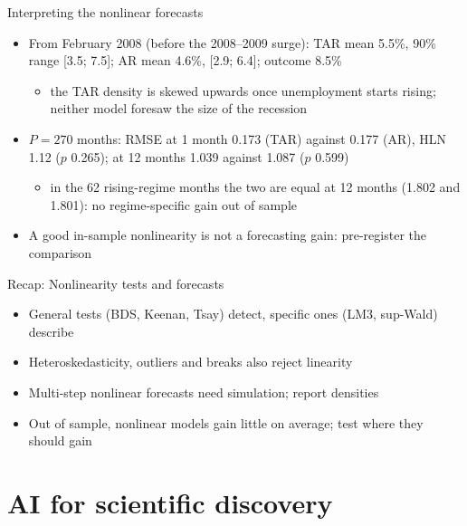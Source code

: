 \begin{frame}{Interpreting the nonlinear forecasts}
\itemsize{\small}
\begin{itemize}
    \item From February 2008 (before the 2008--2009 surge): TAR mean 5.5\%, 90\% range [3.5; 7.5]; AR mean 4.6\%, [2.9; 6.4]; outcome 8.5\%
    \begin{itemize}
        \item the TAR density is skewed upwards once unemployment starts rising; neither model foresaw the size of the recession
    \end{itemize}
    \item $P = 270$ months: RMSE at 1 month 0.173 (TAR) against 0.177 (AR), HLN 1.12 ($p$ 0.265); at 12 months 1.039 against 1.087 ($p$ 0.599)
    \begin{itemize}
        \item in the 62 rising-regime months the two are equal at 12 months (1.802 and 1.801): no regime-specific gain out of sample
    \end{itemize}
    \item A good in-sample nonlinearity is not a forecasting gain: pre-register the comparison
\end{itemize}
\end{frame}

\begin{frame}{Recap: Nonlinearity tests and forecasts}
\itemsize{\small}
\begin{itemize}
    \item General tests (BDS, Keenan, Tsay) detect, specific ones (LM3, sup-Wald) describe
    \item Heteroskedasticity, outliers and breaks also reject linearity
    \item Multi-step nonlinear forecasts need simulation; report densities
    \item Out of sample, nonlinear models gain little on average; test where they should gain
\end{itemize}
\end{frame}


\section{AI for scientific discovery}

